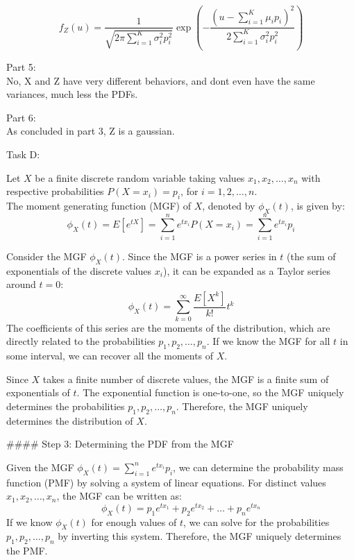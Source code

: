 \documentclass[a4paper,12pt,answers]{exam}
\begin{document}
\begin{questions}
\begin{solution}
\[
f_Z(u) = \frac{1}{\sqrt{2\pi \sum_{i=1}^K \sigma_i^2 p_i^2}} \exp\left(-\frac{(u - \sum_{i=1}^K \mu_i p_i)^2}{2 \sum_{i=1}^K \sigma_i^2 p_i^2}\right)
\]

Part 5: \\
No, X and Z have very different behaviors, and dont even have the same variances, much less the PDFs.

Part 6:\\
As concluded in part 3, Z is a gaussian.
\end{solution}

Task D:\\
\begin{solution}
Let \( X \) be a finite discrete random variable taking values \( x_1, x_2, \dots, x_n \) with respective probabilities \( P(X = x_i) = p_i \), for \( i = 1, 2, \dots, n \).\\

The moment generating function (MGF) of \( X \), denoted by \( \phi_X(t) \), is given by:
\[
\phi_X(t) = E[e^{tX}] = \sum_{i=1}^n e^{t x_i} P(X = x_i) = \sum_{i=1}^n e^{t x_i} p_i
\]

Consider the MGF \( \phi_X(t) \). Since the MGF is a power series in \( t \) (the sum of exponentials of the discrete values \( x_i \)), it can be expanded as a Taylor series around \( t = 0 \):
\[
\phi_X(t) = \sum_{k=0}^{\infty} \frac{E[X^k]}{k!} t^k
\]
The coefficients of this series are the moments of the distribution, which are directly related to the probabilities \( p_1, p_2, \dots, p_n \). If we know the MGF for all \( t \) in some interval, we can recover all the moments of \( X \).

Since \( X \) takes a finite number of discrete values, the MGF is a finite sum of exponentials of \( t \). The exponential function is one-to-one, so the MGF uniquely determines the probabilities \( p_1, p_2, \dots, p_n \). Therefore, the MGF uniquely determines the distribution of \( X \).

#### Step 3: Determining the PDF from the MGF

Given the MGF \( \phi_X(t) = \sum_{i=1}^n e^{t x_i} p_i \), we can determine the probability mass function (PMF) by solving a system of linear equations. For distinct values \( x_1, x_2, \dots, x_n \), the MGF can be written as:
\[
\phi_X(t) = p_1 e^{t x_1} + p_2 e^{t x_2} + \dots + p_n e^{t x_n}
\]
If we know \( \phi_X(t) \) for enough values of \( t \), we can solve for the probabilities \( p_1, p_2, \dots, p_n \) by inverting this system. Therefore, the MGF uniquely determines the PMF.


\end{solution}
\end{questions}
\end{document}
